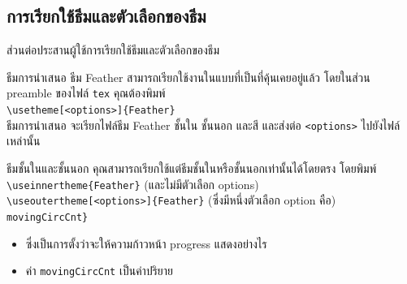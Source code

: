 \documentclass[10pt,xcolor={dvipsnames}]{beamer}
\begin{document}
\subsection{การเรียกใช้ธีมและตัวเลือกของธีม}
\begin{frame}[shrink]{ส่วนต่อประสานผู้ใช้}{การเรียกใช้ธีมและตัวเลือกของธีม}

  \begin{block}{ธีมการนำเสนอ}
    ธีม Feather สามารถเรียกใช้งานในแบบที่เป็นที่คุ้นเคยอยู่แล้ว  โดยในส่วน  preamble ของไฟล์  {\tt tex} คุณต้องพิมพ์ \\ \vspace{5pt} 
    {\tt \textbackslash usetheme[<options>]\{Feather\}}\\ \vspace{5pt} 
    ธีมการนำเสนอ จะเรียกไฟล์ธีม Feather ชั้นใน ชั้นนอก และสี และส่งต่อ  {\tt <options>} ไปยังไฟล์เหล่านั้น
  \end{block}
  \begin{block}{ธีมชั้นในและชั้นนอก}
    คุณสามารถเรียกใช้แต่ธีมชั้นในหรือชั้นนอกเท่านั้นได้โดยตรง โดยพิมพ์ \\ \vspace{5pt} 
    {\tt \textbackslash useinnertheme\{Feather\}} (และไม่มีตัวเลือก options)\\ \vspace{5pt} 
    {\tt \textbackslash useoutertheme[<options>]\{Feather\}} (ซึ่งมีหนึ่งตัวเลือก option คือ)\\
     {\tt movingCircCnt\}} \\
    \begin{itemize}
    \item ซึ่งเป็นการตั้งว่าจะให้ความก้าวหน้า progress แสดงอย่างไร
    \item ค่า {\tt movingCircCnt} เป็นค่าปริยาย
    \end{itemize}
  \end{block}
\end{frame}
\end{document}
